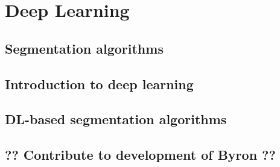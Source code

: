 \chapter{Deep Learning}

\section{Segmentation algorithms}

\section{Introduction to deep learning}

\section{DL-based segmentation algorithms}

\section{?? Contribute to development of Byron ??}
